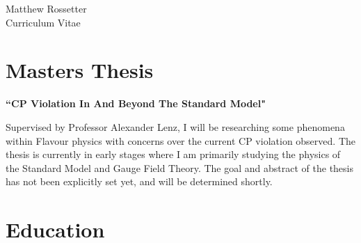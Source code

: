 \documentclass[10pt]{article} %
\begin{document}
\begin{paracol}{2} %


\parbox[top][0.12\textheight][c]{\linewidth}{ %
	\vspace{-0.04\textheight} %
	\centering %
	{\sffamily\Huge Matthew Rossetter}\\\medskip %
	{\Huge\color{headings}\cvtextfont Curriculum Vitae}
}


\section{Masters Thesis}

{\raggedright\textbf{``CP Violation In And Beyond The Standard Model"}\\\medskip}

Supervised by Professor Alexander Lenz, I will be researching some phenomena within Flavour physics with concerns over the current CP violation observed. The thesis is currently in early stages where I am primarily studying the physics of the Standard Model and Gauge Field Theory. 
The goal and abstract of the thesis has not been explicitly set yet, and will be determined shortly.


\medskip %


\section{Education} 



\end{paracol}
\end{document}
